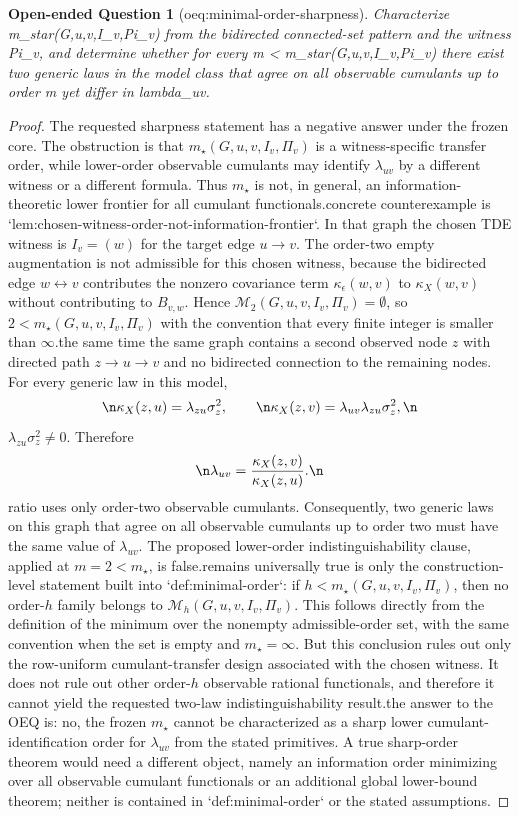 \documentclass{article}
\newtheorem{openendedquestion}{Open-ended Question}
\begin{document}
\begin{openendedquestion}[oeq:minimal-order-sharpness]\label{oeq:minimal-order-sharpness}
Characterize m_star(G,u,v,I_v,Pi_v) from the bidirected connected-set pattern and the witness Pi_v, and determine whether for every m < m_star(G,u,v,I_v,Pi_v) there exist two generic laws in the model class that agree on all observable cumulants up to order m yet differ in lambda_uv.
\end{openendedquestion}
\begin{proof}
The requested sharpness statement has a negative answer under the frozen core. The obstruction is that \(m_\star(G,u,v,I_v,\Pi_v)\) is a witness-specific transfer order, while lower-order observable cumulants may identify \(\lambda_{uv}\) by a different witness or a different formula. Thus \(m_\star\) is not, in general, an information-theoretic lower frontier for all cumulant functionals.\n\nThe concrete counterexample is `lem:chosen-witness-order-not-information-frontier`. In that graph the chosen TDE witness is \(I_v=(w)\) for the target edge \(u\to v\). The order-two empty augmentation is not admissible for this chosen witness, because the bidirected edge \(w\leftrightarrow v\) contributes the nonzero covariance term \(\kappa_\epsilon(w,v)\) to \(\kappa_X(w,v)\) without contributing to \(B_{v,w}\). Hence \(\mathcal M_2(G,u,v,I_v,\Pi_v)=\emptyset\), so \(2<m_\star(G,u,v,I_v,\Pi_v)\) with the convention that every finite integer is smaller than \(\infty\).\n\nAt the same time the same graph contains a second observed node \(z\) with directed path \(z\to u\to v\) and no bidirected connection to the remaining nodes. For every generic law in this model,\n\[\n\kappa_X(z,u)=\lambda_{zu}\sigma_z^2,\qquad\n\kappa_X(z,v)=\lambda_{uv}\lambda_{zu}\sigma_z^2,\n\]\nwith \(\lambda_{zu}\sigma_z^2\ne 0\). Therefore\n\[\n\lambda_{uv}=\frac{\kappa_X(z,v)}{\kappa_X(z,u)}.\n\]\nThis ratio uses only order-two observable cumulants. Consequently, two generic laws on this graph that agree on all observable cumulants up to order two must have the same value of \(\lambda_{uv}\). The proposed lower-order indistinguishability clause, applied at \(m=2<m_\star\), is false.\n\nWhat remains universally true is only the construction-level statement built into `def:minimal-order`: if \(h<m_\star(G,u,v,I_v,\Pi_v)\), then no order-\(h\) family belongs to \(\mathcal M_h(G,u,v,I_v,\Pi_v)\). This follows directly from the definition of the minimum over the nonempty admissible-order set, with the same convention when the set is empty and \(m_\star=\infty\). But this conclusion rules out only the row-uniform cumulant-transfer design associated with the chosen witness. It does not rule out other order-\(h\) observable rational functionals, and therefore it cannot yield the requested two-law indistinguishability result.\n\nThus the answer to the OEQ is: no, the frozen \(m_\star\) cannot be characterized as a sharp lower cumulant-identification order for \(\lambda_{uv}\) from the stated primitives. A true sharp-order theorem would need a different object, namely an information order minimizing over all observable cumulant functionals or an additional global lower-bound theorem; neither is contained in `def:minimal-order` or the stated assumptions.
\end{proof}
\end{document}
